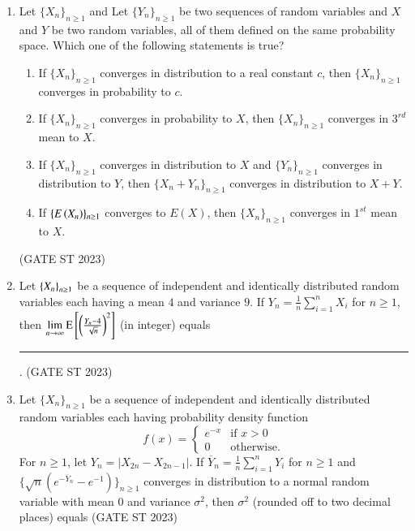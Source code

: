 \begin{enumerate}[label=\thechapter.\arabic*,ref=\thechapter.\theenumi]
\item Let $\{X_n\}_{n \geq 1}$ and Let $\{Y_n\}_{n \geq 1}$ be two sequences of random variables and $X$ and $Y$
be two random variables, all of them defined on the same probability space.
Which one of the following statements is true?
\begin{enumerate}[label=(\Alph*)]
\item If $\{X_n\}_{n \geq 1}$ converges in distribution to a real constant $c$, then $\{X_n\}_{n \geq 1}$
converges in probability to $c$.
\item If $\{X_n\}_{n \geq 1}$ converges in probability to $X$, then $\{X_n\}_{n \geq 1}$ converges in $3^{rd}$ mean
to $X$.
\item If $\{X_n\}_{n \geq 1}$ converges in distribution to $X$ and $\{Y_n\}_{n \geq 1}$ converges in
distribution to $Y$, then $\{X_n + Y_n\}_{n \geq 1}$ converges in distribution to $X+Y$.
\item If $\{E\left(X_n\right)\}_{n \geq 1}$ converges to $E(X)$, then $\{X_n\}_{n \geq 1}$ converges in $1^{st}$ mean to $X$.
\end{enumerate}
\hfill (GATE ST 2023)

\item Let $\left\{X_n\right\}_{n \geq 1}$ be a sequence of independent and identically distributed random variables each having a mean $4$ and variance $9$. If $Y_n = \frac{1}{n} \sum_{i=1}^{n} X_i$ for $n \geq 1$, then $\lim\limits_{n \to \infty} \text{E}{}\left[\left(\frac{Y_n - 4}{\sqrt{n}}\right)^2\right]$ (in integer) equals \rule{2cm}{0.1mm}. \hfill(GATE ST 2023)
\\
\solution

\item Let $\{X_n\}_{n \geq 1}$ be a sequence of independent and identically distributed random variables each having probability density function
\[
f(x) = 
\begin{cases}
  e^{-x} & \text{if } x > 0 \\
  0 & \text{otherwise}.
\end{cases}
\]
For $n \geq 1$, let $Y_n = |X_{2n} - X_{2n-1}|$. If $\overline{Y}_n = \frac{1}{n} \sum_{i=1}^{n} Y_i$ for $n \geq 1$ and $\{\sqrt{n} (e^{-\overline{Y}_n} - e^{-1})\}_{n \geq 1}$ converges in distribution to a normal random variable with mean $0$ and variance $\sigma^2$, then $\sigma^2$ (rounded off to two decimal places) equals \hfill (GATE ST 2023) \\

\end{enumerate}
